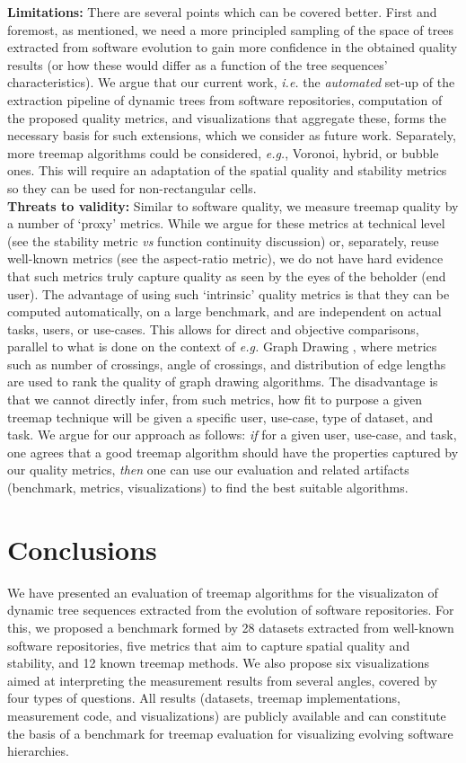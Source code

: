 \noindent\textbf{Limitations:} There are several points which can be covered better. First and foremost, as mentioned, we need a more principled sampling of the space of trees extracted from software evolution to gain more confidence in the obtained quality results (or how these would differ as a function of the tree sequences' characteristics). We argue that our current work, \emph{i.e.} the \emph{automated} set-up of the extraction pipeline of dynamic trees from software repositories, computation of the proposed quality metrics, and visualizations that aggregate these, forms the necessary basis for such extensions, which we consider as future work. Separately, more treemap algorithms could be considered, \emph{e.g.}, Voronoi, hybrid, or bubble ones. This will require an adaptation of the spatial quality and stability metrics so they can be used for non-rectangular cells.\\

\noindent\textbf{Threats to validity:} Similar to software quality, we measure treemap quality by a number of `proxy' metrics. While we argue for these metrics at technical level (see the stability metric \emph{vs} function continuity discussion) or, separately, reuse well-known metrics (see the aspect-ratio metric), we do not have hard evidence that such metrics truly capture quality as seen by the eyes of the beholder (end user). The advantage of using such `intrinsic' quality metrics is that they can be computed automatically, on a large benchmark, and are independent on actual tasks, users, or use-cases. This allows for direct and objective comparisons, parallel to what is done on the context of \emph{e.g.}  Graph Drawing \citep{hachul,battista}, where metrics such as number of crossings, angle of crossings, and distribution of edge lengths are used to rank the quality of graph drawing algorithms. 
The disadvantage is that we cannot directly infer, from such metrics, how fit to purpose a given treemap technique will be given a specific user, use-case, type of dataset, and task. We argue for our approach as follows: \emph{if} for a given user, use-case, and task, one agrees that a good treemap algorithm should have the properties captured by our quality metrics, \emph{then} one can use our evaluation and related artifacts (benchmark, metrics, visualizations) to find the best suitable algorithms.


\section{Conclusions}
\label{sec:conclusions}
%
We have presented an evaluation of treemap algorithms for the visualizaton of dynamic tree sequences extracted from the evolution of software repositories. For this, we proposed a benchmark formed by 28 datasets extracted from well-known software repositories, five metrics that aim to capture spatial quality and stability, and 12 known treemap methods. We also propose six visualizations aimed at interpreting the measurement results from several angles, covered by four types of questions. All results (datasets, treemap implementations, measurement code, and visualizations) are publicly available and can constitute the basis of a benchmark for treemap evaluation for visualizing evolving software hierarchies. 


